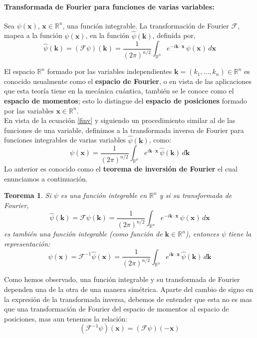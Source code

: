 \documentclass[12pt]{book}
\numberwithin{equation}{chapter}
\newtheorem{theorem}{Teorema}[chapter]
\def\R{\mathbb{R}}
\def\F{\mathcal{F}}
\def\x{\mathbf{x}}
\def\k{\mathbf{k}}
\begin{document}
\paragraph{Transformada de Fourier para funciones de varias variables: } Sea $\psi (\x)$, $ \x \in \R^{n}$, una funci\'on integrable. La transformaci\'on de Fourier $\F$, mapea a la funci\'on $\psi(\x)$, en la funci\'on $\hat{\psi}(\k)$, definida por,
\begin{equation}\label{TF-nD}
\hat{\psi}(\k)= ( \F \psi )(\k)= \frac{1}{(2\pi)^{n/2}} \int_{\R^{n}} e^{-i\k \cdot \x}\, \psi(\x)\, d\x
\end{equation}
\rightline{$\dag$}
\vspace{3 mm}

El espacio $\R^{n}$ formado por las variables independientes $\k= (k_{1},...,k_{n}) \in \R^{n}$ es conocido usualmente como el {\bf espacio de Fourier}, o en vista de las aplicaciones que esta teor\'ia tiene en la mec\'anica cu\'antica, tambi\'en se le conoce como el {\bf espacio de momentos}; esto lo distingue del {\bf espacio de posiciones} formado por las variables $ \x \in \R^{n} $. \\
En vista de la ecuaci\'on \eqref{finv} y siguiendo un procedimiento similar al de las funciones de una variable, definimos a la transformada inversa de Fourier para funciones integrables de varias variables $\hat{\psi}(\k)$, como:
\begin{equation}
\psi(\x)= \frac{1}{(2\pi)^{n/2}} \int_{\R^{n}} e^{i\k \cdot \x} \, \hat{\psi}(\k)\, d\k
\end{equation}
Lo anterior es conocido como el {\bf teorema de inversi\'on de Fourier} el cual enunciamos a continuaci\'on.
\begin{theorem}
Si $\psi$ es una funci\'on integrable en $\R^{n}$ y si su transformada de Fourier,
$$ \hat{\psi}(\k) = \F\psi(\k)=\frac{1}{(2\pi)^{n/2}} \int_{\R^{n}} e^{-i \k \cdot \x} \, \psi(\x)\, d\x $$
es tambi\'en una funci\'on integrable (como funci\'on de $\k \in \R^{n}$), entonces $\psi$ tiene la representaci\'on:
$$ \psi(\x) =  \F^{-1}\hat{\psi}(\x) =\frac{1}{(2\pi)^{n/2}} \int_{\R^{n}} e^{i \k \cdot \x} \, \hat{\psi}(\k)\, d\k $$ 
\end{theorem}
\rightline{$\dag$}
\vspace{5 mm}

Como hemos observado, una funci\'on integrable y su transformada de Fourier dependen una de la otra de una manera sim\'etrica. Aparte del cambio de signo en la expresi\'on de la transformada inversa, debemos de entender que esta no es mas que una transformaci\'on de Fourier del espacio de momentos al espacio de posiciones, mas aun tenemos la relaci\'on:
\begin{equation}
(\F^{-1}\psi)(\x)= (\F \psi)(-\x)
\end{equation}
\end{document}
